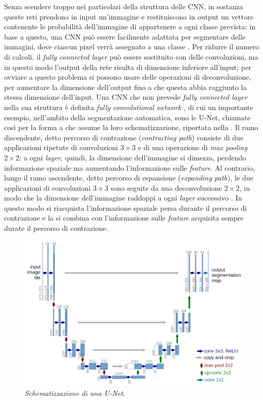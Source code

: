 Senza scendere troppo nei particolari della struttura delle CNN, in sostanza queste reti prendono in input un'immagine e restituiscono in output un vettore contenente le probabilità dell'immagine di appartenere a ogni classe prevista: in base a questo, una CNN può essere facilmente adattata per segmentare delle immagini, dove ciascun pixel verrà assegnato a una classe \cite[23]{LaRosa}. Per ridurre il numero di calcoli, il \textit{fully connected layer} può essere sostituito con delle convoluzioni, ma in questo modo l'output della rete risulta di dimensione inferiore all'input; per ovviare a questo problema si possono usare delle operazioni di deconvoluzione, per aumentare la dimensione dell'output fino a che questa abbia raggiunto la stessa dimensione dell'input. Una CNN che non prevede \textit{fully connected layer} nella sua struttura è definita \textit{fully convolutional network} \cite[23-24]{LaRosa}, di cui un importante esempio, nell'ambito della segmentazione automatica, sono le U-Net, chiamate così per la forma a  che assume la loro schematizzazione, riportata nella . Il ramo discendente, detto percorso di contrazione (\textit{contracting path}) consiste di due applicazioni ripetute di convoluzioni $3\times3$ e di una operazione di \textit{max pooling} $2\times2$: a ogni \textit{layer}, quindi, la dimensione dell'immagine si dimezza, perdendo informazione spaziale ma aumentando l'informazione sulle \textit{feature}. Al contrario, lungo il ramo ascendente, detto percorso di espansione (\textit{expanding path}), le due applicazioni di convoluzioni $3\times3$ sono seguite da una deconvoluzione $2\times2$, in modo che la dimensione dell'immagine raddoppi a ogni \textit{layer} successivo \cite{wiki:unet}. In questo modo si riacquista l'informazione spaziale persa durante il percorso di contrazione e la si combina con l'informazione sulle \textit{feature} acquisita sempre durate il percorso di contrazione.

\begin{figure}[htp]
\centering
\includegraphics[scale=0.25]{Immagini/unet.png}
\caption{\label{fig:unet} \textit{Schematizzazione di una U-Net}.}
\end{figure}

